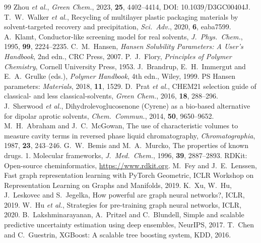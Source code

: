 \documentclass[11pt,a4paper]{article}
\begin{document}
\begin{thebibliography}{99}
 Zhou \emph{et al.}, \emph{Green Chem.}, 2023, \textbf{25}, 4402--4414, DOI: 10.1039/D3GC00404J.
 T.~W.~Walker \emph{et al.}, Recycling of multilayer plastic packaging materials by
solvent-targeted recovery and precipitation, \emph{Sci.\ Adv.}, 2020, \textbf{6}, eaba7599.
 A.~Klamt, Conductor-like screening model for real solvents, \emph{J.\ Phys.\ Chem.},
1995, \textbf{99}, 2224--2235.
 C.~M.~Hansen, \emph{Hansen Solubility Parameters: A User's Handbook}, 2nd edn., CRC
Press, 2007.
 P.~J.~Flory, \emph{Principles of Polymer Chemistry}, Cornell University Press, 1953.
 J.~Brandrup, E.~H.~Immergut and E.~A.~Grulke (eds.), \emph{Polymer Handbook}, 4th
edn., Wiley, 1999.
 PS Hansen parameters: \emph{Materials}, 2018, \textbf{11}, 1529.
 D.~Prat \emph{et al.}, CHEM21 selection guide of classical- and less
classical-solvents, \emph{Green Chem.}, 2016, \textbf{18}, 288--296.
 J.~Sherwood \emph{et al.}, Dihydrolevoglucosenone (Cyrene) as a bio-based alternative
for dipolar aprotic solvents, \emph{Chem.\ Commun.}, 2014, \textbf{50}, 9650--9652.
 M.~H.~Abraham and J.~C.~McGowan, The use of characteristic volumes to measure cavity
terms in reversed phase liquid chromatography, \emph{Chromatographia}, 1987, \textbf{23}, 243--246.
 G.~W.~Bemis and M.~A.~Murcko, The properties of known drugs. 1. Molecular frameworks,
\emph{J.\ Med.\ Chem.}, 1996, \textbf{39}, 2887--2893.
 RDKit: Open-source cheminformatics, \url{https://www.rdkit.org}.
 M.~Fey and J.~E.~Lenssen, Fast graph representation learning with PyTorch Geometric,
ICLR Workshop on Representation Learning on Graphs and Manifolds, 2019.
 K.~Xu, W.~Hu, J.~Leskovec and S.~Jegelka, How powerful are graph neural networks?,
ICLR, 2019.
 W.~Hu \emph{et al.}, Strategies for pre-training graph neural networks, ICLR, 2020.
 B.~Lakshminarayanan, A.~Pritzel and C.~Blundell, Simple and scalable predictive
uncertainty estimation using deep ensembles, NeurIPS, 2017.
 T.~Chen and C.~Guestrin, XGBoost: A scalable tree boosting system, KDD, 2016.
\end{thebibliography}
\end{document}
